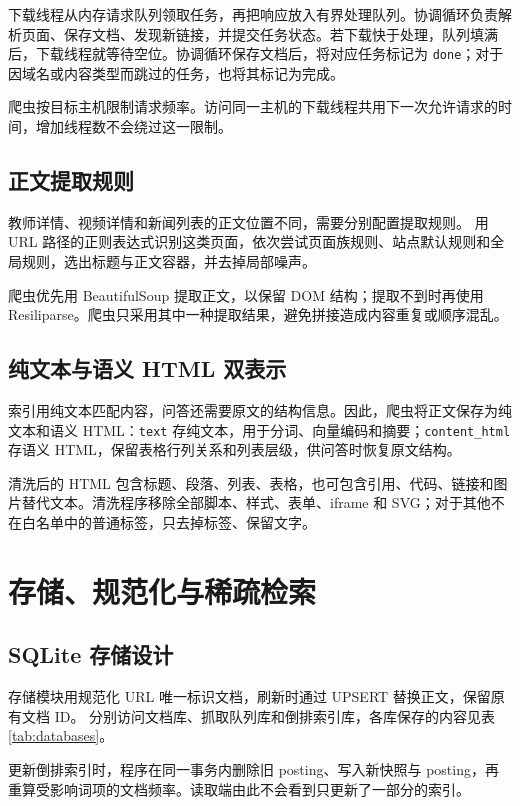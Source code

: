 \documentclass[UTF8,zihao=-4,fontset=fandol]{ctexart}
\newcommand{\code}[1]{\texttt{#1}}
\begin{document}
下载线程从内存请求队列领取任务，再把响应放入有界处理队列。协调循环负责解析页面、保存文档、发现新链接，并提交任务状态。若下载快于处理，队列填满后，下载线程就等待空位。协调循环保存文档后，将对应任务标记为 \code{done}；对于因域名或内容类型而跳过的任务，也将其标记为完成。

爬虫按目标主机限制请求频率。访问同一主机的下载线程共用下一次允许请求的时间，增加线程数不会绕过这一限制。

\subsection{正文提取规则}

教师详情、视频详情和新闻列表的正文位置不同，需要分别配置提取规则。 用 URL 路径的正则表达式识别这类页面，依次尝试页面族规则、站点默认规则和全局规则，选出标题与正文容器，并去掉局部噪声。

爬虫优先用 BeautifulSoup 提取正文，以保留 DOM 结构；提取不到时再使用 Resiliparse。爬虫只采用其中一种提取结果，避免拼接造成内容重复或顺序混乱。

\subsection{纯文本与语义 HTML 双表示}

索引用纯文本匹配内容，问答还需要原文的结构信息。因此，爬虫将正文保存为纯文本和语义 HTML：\code{text} 存纯文本，用于分词、向量编码和摘要；\code{content\_html} 存语义 HTML，保留表格行列关系和列表层级，供问答时恢复原文结构。

清洗后的 HTML 包含标题、段落、列表、表格，也可包含引用、代码、链接和图片替代文本。清洗程序移除全部脚本、样式、表单、iframe 和 SVG；对于其他不在白名单中的普通标签，只去掉标签、保留文字。

\section{存储、规范化与稀疏检索}

\subsection{SQLite 存储设计}

存储模块用规范化 URL 唯一标识文档，刷新时通过 UPSERT 替换正文，保留原有文档 ID。 分别访问文档库、抓取队列库和倒排索引库，各库保存的内容见表\ref{tab:databases}。

更新倒排索引时，程序在同一事务内删除旧 posting、写入新快照与 posting，再重算受影响词项的文档频率。读取端由此不会看到只更新了一部分的索引。
\end{document}
